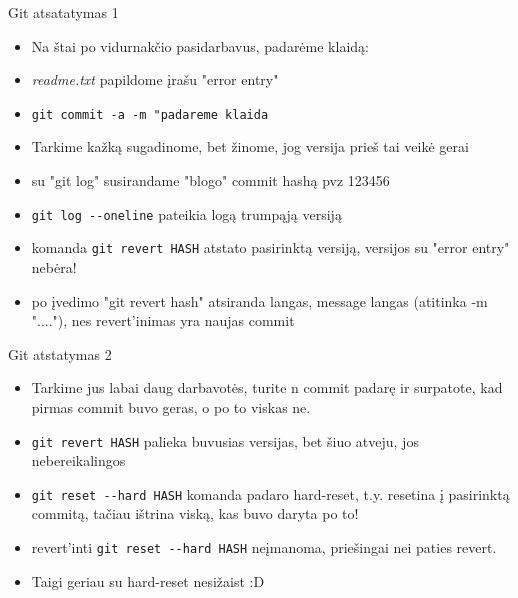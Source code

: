 \documentclass[11pt,xcolor=table]{beamer}
\begin{document}

\begin{frame}[fragile]{Git atsatatymas 1}
\begin{itemize}
\item Na štai po vidurnakčio pasidarbavus, padarėme klaidą:
\item \textit{readme.txt} papildome įrašu "error entry"
\item \colorbox{listinggray}{\lstinline|git commit -a -m "padareme klaida|}
\item Tarkime kažką sugadinome, bet žinome, jog versija prieš tai veikė gerai
\item su "git log" susirandame "blogo" commit hashą  pvz 123456
\item \colorbox{listinggray}{\lstinline|git log --oneline|} pateikia logą trumpąją versiją
\item komanda \colorbox{listinggray}{\lstinline|git revert HASH|} atstato pasirinktą versiją, versijos su "error entry" nebėra!
\item po įvedimo "git revert hash" atsiranda langas, message langas (atitinka -m "...."), nes revert'inimas yra naujas commit
\end{itemize}
\end{frame}



\begin{frame}[fragile]{Git atstatymas 2}
\begin{itemize}
\item Tarkime jus labai daug darbavotės, turite n commit padarę ir surpatote, kad pirmas commit buvo geras, o po to viskas ne.
\item \colorbox{listinggray}{\lstinline|git revert HASH|} palieka buvusias versijas, bet šiuo atveju, jos nebereikalingos
\item \colorbox{listinggray}{\lstinline|git reset --hard HASH|} komanda padaro hard-reset, t.y. resetina į pasirinktą commitą, tačiau ištrina viską, kas buvo daryta po to! 
\item revert'inti \colorbox{listinggray}{\lstinline|git reset --hard HASH|} neįmanoma, priešingai nei paties revert.
\item Taigi geriau su hard-reset nesižaist :D
\end{itemize}
\end{frame}

\end{document}
